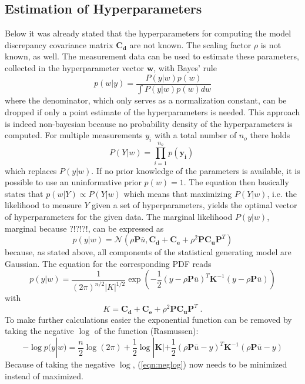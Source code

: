 \documentclass[%
  a4paper,oneside,%
  11pt,%
  smallchapters,
  green,%
  rgb, <cmyk>
  ,]{tubsbook}
\begin{document}
\subsection{Estimation of Hyperparameters}
Below it was already stated that the hyperparameters for computing the model discrepancy covariance matrix $\bm{C_d}$ are not known. The scaling factor $\rho$ is not known, as well. The measurement data can be used to estimate these parameters, collected in the hyperparameter vector $\bm{w}$, with Bayes' rule 
%
\begin{equation}
p(w|y) = \frac{P(y|w) p(w)}{\int P(y|w) p(w) dw}
\end{equation}
%
where the denominator, which only serves as a normalization constant, can be dropped if only a point estimate of the hyperparameters is needed. This approach is indeed non-bayesian because no probability density of the hyperparameters is computed. For multiple measurements $y_i$ with a total number of $n_o$ there holds 
\begin{equation}
P(Y|w) = \prod_{i=1}^{n_o} p(\bm{y_i}) \; 
\end{equation}
which replaces $P(y|w)$.
If no prior knowledge of the parameters is available, it is possible to use an uninformative prior $p(w) = 1$.
The equation then basically states that $p(w|Y) \propto P(Y|w)$ which means that maximizing  $P(Y|w)$, i.e. the likelihood to measure $Y$ given a set of hyperparameters, yields the optimal vector of hyperparameters for the given data. 
The marginal likelihood $P(y|w)$, marginal because ?!?!?!, can be expressed as 
\begin{equation}
p(y|w) = \mathcal{N}(\rho \bm{P}\bar{u}, \bm{C_d}+\bm{C_e} + \rho^2 \bm{P} \bm{C_u} \bm{P}^T)
\end{equation}
because, as stated above, all components of the statistical generating model are Gaussian.
The equation for the corresponding PDF reads
\begin{equation}
p(y|w) = \frac{1}{(2 \pi)^{n/2} |K|^{1/2} } \exp \left(   -\frac{1}{2} (y - \rho \bm{P}\bar{u})^T \bm{K}^{-1} (y - \rho \bm{P}\bar{u})   \right)
\end{equation}
with
\begin{equation}
K = \bm{C_d}+\bm{C_e} + \rho^2 \bm{P} \bm{C_u} \bm{P}^T \; .
\end{equation}
%
To make further calculations easier the exponential function can be removed by taking the negative $\log$ of the function (Rasmussen):
\begin{equation}
- \log p(y|w) = \frac{n}{2} \log(2 \pi) + \frac{1}{2} \log |\bm{K}| + \frac{1}{2}(\rho \bm{P}\bar{u} - y)^T \bm{K}^{-1} (\rho \bm{P}\bar{u} - y) 
\label{eqn:neglog}
\end{equation}
Because of taking the negative $\log$, (\ref{eqn:neglog}) now needs to be minimized instead of maximized. 
\end{document}
